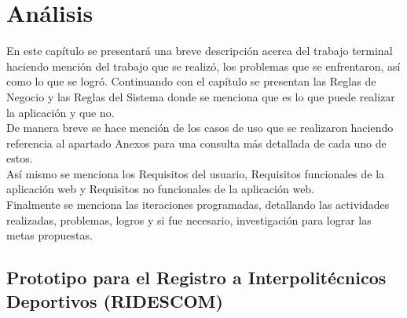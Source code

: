 \chapter{Análisis}

	\noindent En este capítulo se presentará una breve descripción acerca del trabajo terminal haciendo mención del trabajo que se realizó, los problemas que se enfrentaron, así como lo que se logró. Continuando con el capítulo se presentan las Reglas de Negocio y las Reglas del Sistema donde se menciona que es lo que puede realizar la aplicación y que no.\\
	De manera breve  se hace mención de los casos de uso que se realizaron haciendo referencia al apartado Anexos para una consulta más detallada de cada uno de estos.\\
	Así mismo se menciona los Requisitos del usuario, Requisitos funcionales de la aplicación web y Requisitos no funcionales de la aplicación web.\\
	Finalmente se menciona las iteraciones programadas, detallando las actividades realizadas, problemas, logros y si fue necesario, investigación para lograr las metas propuestas.\\
	
	
	\section{Prototipo para el Registro a Interpolit\'ecnicos Deportivos (RIDESCOM)}
	

